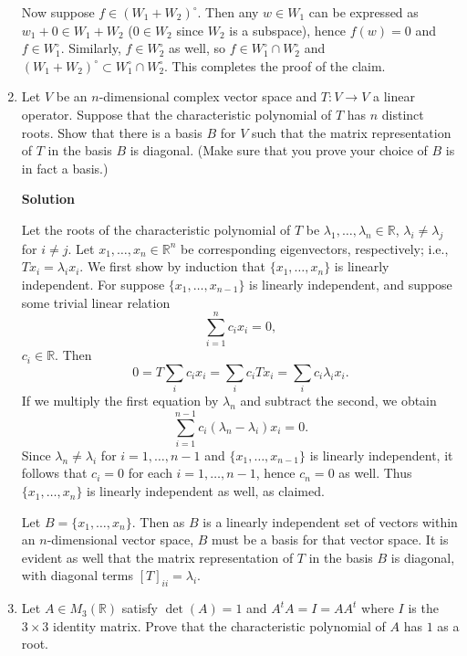 \documentclass{article}
\begin{document}
\begin{enumerate}
Now suppose \(f \in (W_1 + W_2)^{\circ}\).  Then any \(w \in W_1\) can be expressed as \(w_1 + 0 \in W_1 + W_2\) (\(0 \in W_2\) since \(W_2\) is a subspace), hence \(f(w) = 0\) and \(f \in W_1^{\circ}\).  Similarly, \(f \in W_2^{\circ}\) as well, so \(f \in W_1^{\circ} \cap W_2^{\circ}\) and \((W_1 + W_2)^{\circ} \subset W_1^{\circ} \cap W_2^{\circ}\).  This completes the proof of the claim.



\item Let \(V\) be an \(n\)-dimensional complex vector space and \(T : V \to V\) a linear operator.  Suppose that the characteristic polynomial of \(T\) has \(n\) distinct roots.  Show that there is a basis \(B\) for \(V\) such that the matrix representation of \(T\) in the basis \(B\) is diagonal.  (Make sure that you prove your choice of \(B\) is in fact a basis.)

{\bf Solution}

Let the roots of the characteristic polynomial of \(T\) be \(\lambda_1, \ldots, \lambda_n \in \mathbb{R}\), \(\lambda_i \neq \lambda_j\) for \(i \neq j\).  Let \(x_1, \ldots, x_n \in \mathbb{R}^n\) be corresponding eigenvectors, respectively; i.e., \(T x_i = \lambda_i x_i\).  We first show by induction that \(\{x_1, \ldots, x_n\}\) is linearly independent.  For suppose \(\{x_1, \ldots, x_{n-1}\}\) is linearly independent, and suppose some trivial linear relation
\[\sum_{i = 1}^n c_i x_i = 0,\]
\(c_i \in \mathbb{R}\).  Then
\[0 = T \sum_i c_i x_i = \sum_i c_i T x_i = \sum_i c_i \lambda_i x_i.\]
If we multiply the first equation by \(\lambda_n\) and subtract the second, we obtain
\[\sum_{i = 1}^{n - 1} c_i (\lambda_n - \lambda_i) x_i = 0.\]
Since \(\lambda_n \neq \lambda_i\) for \(i = 1, \ldots, n - 1\) and \(\{x_1, \ldots, x_{n - 1}\}\) is linearly independent, it follows that \(c_i = 0\) for each \(i = 1, \ldots, n - 1\), hence \(c_n = 0\) as well.  Thus \(\{x_1, \ldots, x_n\}\) is linearly independent as well, as claimed.

Let \(B = \{x_1, \ldots, x_n\}\).  Then as \(B\) is a linearly independent set of vectors within an \(n\)-dimensional vector space, \(B\) must be a basis for that vector space.  It is evident as well that the matrix representation of \(T\) in the basis \(B\) is diagonal, with diagonal terms \([T]_{ii} = \lambda_i\).



\item Let \(A \in M_3(\mathbb{R})\) satisfy \(\det(A) = 1\) and \(A^tA = I = AA^t\) where \(I\) is the \(3 \times 3\) identity matrix.  Prove that the characteristic polynomial of \(A\) has \(1\) as a root.


\end{enumerate}
\end{document}
